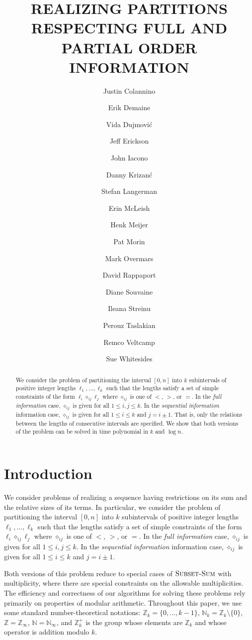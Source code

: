 \documentclass[lotsofwhite]{patmorin}
\title{\MakeUppercase{Realizing Partitions Respecting Full
and Partial Order Information}}
\author{
	Justin Colannino \and
	Erik Demaine \and
	Vida Dujmovi\'c \and
	Jeff Erickson \and
	John Iacono \and
	Danny Krizan\'c \and
	Stefan Langerman \and
	Erin McLeish \and
	Henk Meijer \and
	Pat Morin \and
	Mark Overmars \and
	David Rappaport \and
	Diane Souvaine \and
	Ileana Streinu \and
	Perouz Taslakian \and
	Remco Veltcamp \and
	Sue Whitesides
}
\date{}
\newcommand{\Z}{\mathbb{Z}}
\newcommand{\N}{\mathbb{N}}
\newcommand{\defeq}{=}
\newcommand{\op}{\diamond}
\newcommand{\opij}{\op_{ij}}
\begin{document}
\maketitle

\begin{abstract}
We consider the problem of partitioning the interval $[0,n]$ into $k$
subintervals of positive integer lengths $\ell_1,\ldots,\ell_k$ such that
the lengths satisfy a set of simple constraints of the form $\ell_i
\opij \ell_j$ where $\opij$ is one of $<$, $>$, or $=$.  In the
\emph{full information} case, $\opij$ is given for all $1\le i,j\le
k$.  In the \emph{sequential information} information case, $\opij$ is
given for all $1\le i\le k$ and $j=i\pm 1$.  That is, only the
relations between the lengths of consecutive intervals are specified.
We show that both versions of the problem can be solved
in time polynomial in $k$ and $\log n$.
\end{abstract}

\section{Introduction}

We consider problems of realizing a sequence having restrictions on
its sum and the relative sizes of its terms.  In particular, we
consider the problem of partitioning the interval $[0,n]$ into $k$
subintervals of positive integer lengths $\ell_1,\ldots,\ell_k$ such
that the lengths satisfy a set of simple constraints of the form
$\ell_i \opij \ell_j$ where $\opij$ is one of $<$, $>$, or $=$.  In
the \emph{full information} case, $\opij$ is given for all $1\le
i,j\le k$.  In the \emph{sequential information} information case,
$\opij$ is given for all $1\le i\le k$ and $j=i\pm 1$. 



Both versions of this problem reduce to special cases of
$\textsc{Subset-Sum}$ with multiplicity, where there are special
constraints on the allowable multiplicities.  The efficiency and
correctness of our algorithms for solving these problems rely
primarily on properties of modular arithmetic. Throughout this paper,
we use some standard number-theoretical notations: $\Z_k\defeq
\{0,\ldots,k-1\}$, $\N_k\defeq\Z_k\setminus\{0\}$, $\Z\defeq\Z_\infty$,
$\N\defeq\N_\infty$, and $\Z_k^+$ is the group whose elements are
$\Z_k$ and whose operator is addition modulo $k$.
\end{document}
